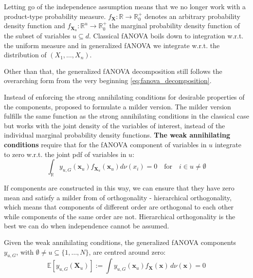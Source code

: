 Letting go of the independence assumption means that we no longer work with a product-type probability measure. $f_{\boldsymbol{X}}: \mathbb{R} \rightarrow \mathbb{R}_{0}^{+}$ denotes an arbitrary probability density function and $f_{\boldsymbol{X}_u}: \mathbb{R}^u \rightarrow \mathbb{R}_{0}^{+}$ the marginal probability density function of the subset of variables $u \subseteq d$.
Classical fANOVA boils down to integration w.r.t. the uniform measure and in generalized fANOVA we integrate w.r.t. the distribution of $(X_1, \dots, X_n)$.\par
Other than that, the generalized fANOVA decomposition still follows the overarching form from the very beginning \autoref{eq:fanova_decomposition}.\par

Instead of enforcing the strong annihilating conditions for desirable properties of the components, \cite{rahman2014} proposed to formulate a milder version.
The milder version fulfills the same function as the strong annihilating conditions in the classical case but works with the joint density of the variables of interest, instead of the individual marginal probability density functions.
\textbf{The weak annihilating conditions} require that for the fANOVA component of variables in $u$ integrate to zero w.r.t. the joint pdf of variables in $u$:
\begin{equation}
    \int_{\mathbb{R}} y_{u, G}(\boldsymbol{x}_u) f_{\boldsymbol{X}_u}(\boldsymbol{x}_u) d\nu (x_i) = 0 \quad \text{for} \quad i \in u \neq \emptyset
\end{equation}

If components are constructed in this way, we can ensure that they have zero mean and satisfy a milder from of orthogonality - hierarchical orthogonality, which means that components of different order are orthogonal to each other while components of the same order are not. Hierarchical orthogonality is the best we can do when independence cannot be assumed.
\begin{proposition}
    Given the weak annihilating conditions, the generalized fANOVA components $y_{u, G}$, with $\emptyset \neq u \subseteq \{1, \ldots, N\}$, are centred around zero:
\begin{equation}
    \mathbb{E}[y_{u, G}(\boldsymbol{X}_u)] := \int y_{u, G}(\boldsymbol{x}_u) f_{\boldsymbol{X}}(\boldsymbol{x}) \, d\nu (\boldsymbol{x}) = 0
    \label{eq:zero_mean_g}
\end{equation}
\end{proposition}

